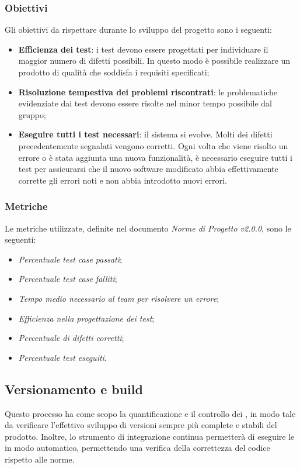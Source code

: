 \subsubsection{Obiettivi} 
Gli obiettivi da rispettare durante lo sviluppo del progetto sono i seguenti:
\begin{itemize}
	\item{\textbf{Efficienza dei test}: i test devono essere progettati per individuare il maggior numero di difetti possibili. In questo modo è possibile realizzare un prodotto di qualità che soddisfa i requisiti specificati;}
	\item{\textbf{Risoluzione tempestiva dei problemi riscontrati}: le problematiche evidenziate dai test devono essere risolte nel minor tempo possibile dal gruppo;}
	\item{\textbf{Eseguire tutti i test necessari}: il sistema si evolve. Molti dei difetti precedentemente segnalati vengono corretti. Ogni volta che viene risolto un errore o è stata aggiunta una nuova funzionalità, è necessario eseguire tutti i test per assicurarsi che il nuovo software modificato abbia effettivamente corrette gli errori noti e non abbia introdotto nuovi errori.}
\end{itemize}
\subsubsection{Metriche}
Le metriche utilizzate, definite nel documento \emph{Norme di Progetto v2.0.0}, sono le seguenti:
\begin{itemize}
	\item{\emph{Percentuale test case passati};}
	\item{\emph{Percentuale test case falliti};}
	\item{\emph{Tempo medio necessario al team per risolvere un errore};}
	\item{\emph{Efficienza nella progettazione dei test};}
	\item{\emph{Percentuale di difetti corretti};}
	\item{\emph{Percentuale test eseguiti}.}

\end{itemize}

\subsection{Versionamento e build} 
Questo processo ha come scopo la quantificazione e il controllo dei , in modo tale da verificare l'effettivo sviluppo di versioni sempre più complete e stabili del prodotto. Inoltre, lo strumento di integrazione continua  permetterà di eseguire le  in modo automatico, permettendo una verifica della correttezza del codice rispetto alle norme.
